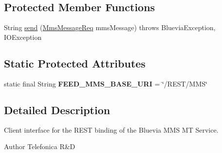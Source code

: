 \subsection*{Protected Member Functions}
\begin{DoxyCompactItemize}
\item 
String \hyperlink{classcom_1_1bluevia_1_1messagery_1_1mt_1_1mms_1_1client_1_1BVMtMms_a4b726880685384043c4bd1ba4a8fa43b}{send} (\hyperlink{classcom_1_1bluevia_1_1messagery_1_1mt_1_1mms_1_1data_1_1MmsMessageReq}{MmsMessageReq} mmsMessage)  throws BlueviaException, IOException 
\end{DoxyCompactItemize}
\subsection*{Static Protected Attributes}
\begin{DoxyCompactItemize}
\item 
\hypertarget{classcom_1_1bluevia_1_1messagery_1_1mt_1_1mms_1_1client_1_1BVMtMms_addd9195928d776f9c255169c90dd5b31}{
static final String {\bfseries FEED\_\-MMS\_\-BASE\_\-URI} = \char`\"{}/REST/MMS\char`\"{}}
\label{classcom_1_1bluevia_1_1messagery_1_1mt_1_1mms_1_1client_1_1BVMtMms_addd9195928d776f9c255169c90dd5b31}

\end{DoxyCompactItemize}


\subsection{Detailed Description}
Client interface for the REST binding of the Bluevia MMS MT Service.

\begin{DoxyAuthor}{Author}
Telefonica R\&D 
\end{DoxyAuthor}



